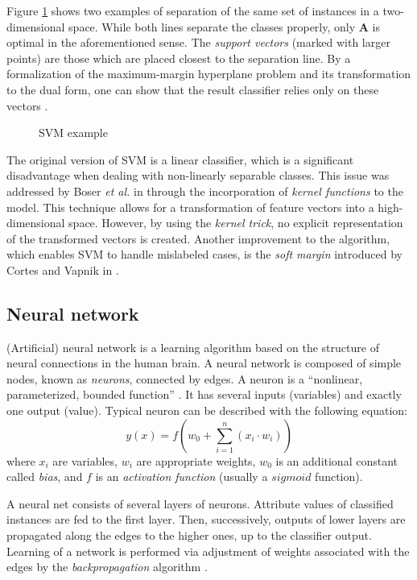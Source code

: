 \documentclass{pracamgr}
\begin{document}
Figure \ref{fig:svm} shows two examples of separation of the same set of instances in a two-dimensional space. While both lines separate the classes properly, only \textbf{A} is optimal in the aforementioned sense. The \emph{support vectors} (marked with larger points) are those which are placed closest to the separation line. By a formalization of the maximum-margin hyperplane problem and its transformation to the dual form, one can show that the result classifier relies only on these vectors \cite[pp. 942--944]{encyclopedia}.

\begin{figure}[h]
\centering

\caption{SVM example}
\label{fig:svm}
\end{figure}

The original version of SVM is a linear classifier, which is a significant disadvantage when dealing with non-linearly separable classes. This issue was addressed by Boser \emph{et al.} in \cite{Boser} through the incorporation of \emph{kernel functions} to the model. This technique allows for a transformation of feature vectors into a high-dimensional space. However, by using the \emph{kernel trick}, no explicit representation of the transformed vectors is created. Another improvement to the algorithm, which enables SVM to handle mislabeled cases, is the \emph{soft margin} introduced by Cortes and Vapnik in \cite{Cortes}.

\subsection{Neural network}
\label{sec:neural_net}

(Artificial) neural network is a learning algorithm based on the structure of neural connections in the human brain. A neural network is composed of simple nodes, known as \emph{neurons}, connected by edges. A neuron is a ``nonlinear, parameterized, bounded function'' \cite[p. 2]{neural_networks}. It has several inputs (variables) and exactly one output (value). Typical neuron can be described with the following equation:
\[y(x) = f\left(w_0 + \sum\limits_{i = 1}^{n} (x_i \cdot w_i) \right)\]
where $x_i$ are variables, $w_i$ are appropriate weights, $w_0$ is an additional constant called \emph{bias}, and $f$ is an \emph{activation function} (usually a $sigmoid$ function).

A neural net consists of several layers of neurons. Attribute values of classified instances are fed to the first layer. Then, successively, outputs of lower layers are propagated along the edges to the higher ones, up to the classifier output. Learning of a network is performed via adjustment of weights associated with the edges by the \emph{backpropagation} algorithm \cite[p. 31]{neural_networks}.
\end{document}
